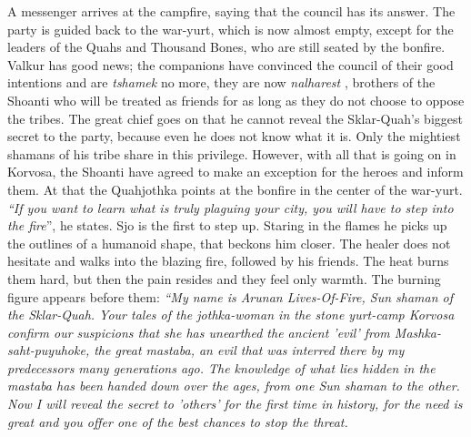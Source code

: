 A messenger arrives at the campfire, saying that the council has its answer. The party is guided back to the war-yurt, which is now almost empty, except for the leaders of the Quahs and Thousand Bones, who are still seated by the bonfire. Valkur has good news; the companions have convinced the council of their good intentions and are {\itshape tshamek} no more, they are now  {\itshape nalharest} , brothers of the Shoanti who will be treated as friends for as long as they do not choose to oppose the tribes. The great chief goes on that he cannot reveal the Sklar-Quah's biggest secret to the party, because even he does not know what it is. Only the mightiest shamans of his tribe share in this privilege. However, with all that is going on in Korvosa, the Shoanti have agreed to make an exception for the heroes and inform them. At that the Quahjothka points at the bonfire in the center of the war-yurt. {\itshape``If you want to learn what is truly plaguing your city, you will have to step into the fire}'', he states. Sjo is the first to step up. Staring in the flames he picks up the outlines of a humanoid shape, that beckons him closer. The healer does not hesitate and walks into the blazing fire, followed by his friends. The heat burns them hard, but then the pain resides and they feel only warmth. The burning figure appears before them: {\itshape``My name is Arunan Lives-Of-Fire, Sun shaman of the Sklar-Quah. Your tales of the jothka-woman in the stone yurt-camp Korvosa confirm our suspicions that she has unearthed the ancient 'evil' from Mashka-saht-puyuhoke, the great mastaba, an evil that was interred there by my predecessors many generations ago. The knowledge of what lies hidden in the mastaba has been handed down over the ages, from one Sun shaman to the other. Now I will reveal the secret to 'others' for the first time in history, for the need is great and you offer one of the best chances to stop the threat.\\

}
